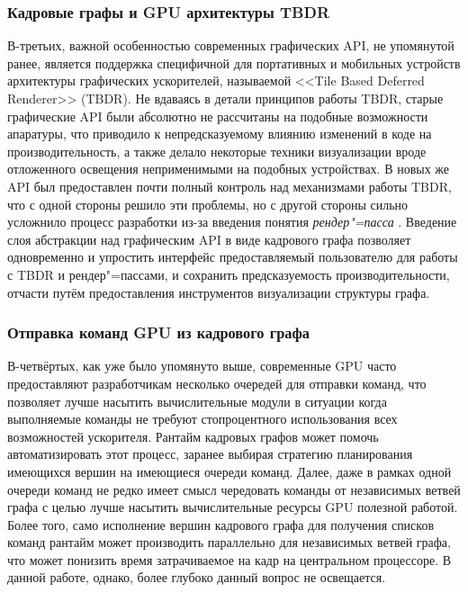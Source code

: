 \subsubsection{Кадровые графы и GPU архитектуры TBDR}
В-третьих, важной особенностью современных графических API, не упомянутой ранее, является поддержка специфичной для портативных и мобильных устройств архитектуры графических ускорителей, называемой <<Tile Based Deferred Renderer>> (TBDR).
Не вдаваясь в детали принципов работы TBDR, старые графические API были абсолютно не рассчитаны на подобные возможности апаратуры, что приводило к непредсказуемому влиянию изменений в коде на производительность, а также делало некоторые техники визуализации вроде отложенного освещения неприменимыми на подобных устройствах.
В новых же API был предоставлен почти полный контроль над механизмами работы TBDR, что с одной стороны решило эти проблемы, но с другой стороны сильно усложнило процесс разработки из-за введения понятия \textit{рендер"=пасса} \cite[раздел~8]{VulkanSpec}.
Введение слоя абстракции над графическим API в виде кадрового графа позволяет одновременно и упростить интерфейс предоставляемый пользователю для работы с TBDR и рендер"=пассами, и сохранить предсказуемость производительности, отчасти путём предоставления инструментов визуализации структуры графа.

\subsubsection{Отправка команд GPU из кадрового графа}
В-четвёртых, как уже было упомянуто выше, современные GPU часто предоставляют разработчикам несколько очередей для отправки команд, что позволяет лучше насытить вычислительные модули в ситуации когда выполняемые команды не требуют стопроцентного использования всех возможностей ускорителя.
Рантайм кадровых графов может помочь автоматизировать этот процесс, заранее выбирая стратегию планирования имеющихся вершин на имеющиеся очереди команд.
Далее, даже в рамках одной очереди команд не редко имеет смысл чередовать команды от независимых ветвей графа с целью лучше насытить вычислительные ресурсы GPU полезной работой.
Более того, само исполнение вершин кадрового графа для получения списков команд рантайм может производить параллельно для независимых ветвей графа, что может понизить время затрачиваемое на кадр на центральном процессоре.
В данной работе, однако, более глубоко данный вопрос не освещается.

